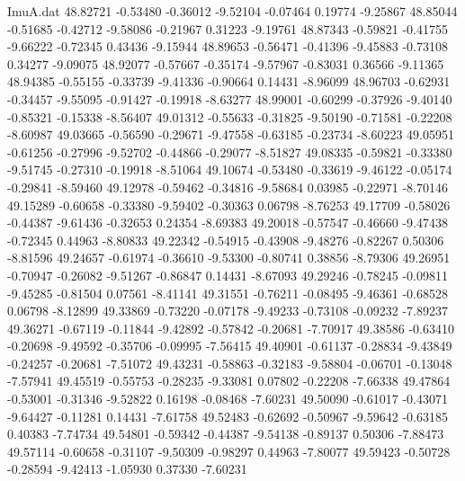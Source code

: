 \begin{filecontents}{ImuA.dat}
  48.82721   -0.53480   -0.36012   -9.52104   -0.07464    0.19774   -9.25867
  48.85044   -0.51685   -0.42712   -9.58086   -0.21967    0.31223   -9.19761
  48.87343   -0.59821   -0.41755   -9.66222   -0.72345    0.43436   -9.15944
  48.89653   -0.56471   -0.41396   -9.45883   -0.73108    0.34277   -9.09075
  48.92077   -0.57667   -0.35174   -9.57967   -0.83031    0.36566   -9.11365
  48.94385   -0.55155   -0.33739   -9.41336   -0.90664    0.14431   -8.96099
  48.96703   -0.62931   -0.34457   -9.55095   -0.91427   -0.19918   -8.63277
  48.99001   -0.60299   -0.37926   -9.40140   -0.85321   -0.15338   -8.56407
  49.01312   -0.55633   -0.31825   -9.50190   -0.71581   -0.22208   -8.60987
  49.03665   -0.56590   -0.29671   -9.47558   -0.63185   -0.23734   -8.60223
  49.05951   -0.61256   -0.27996   -9.52702   -0.44866   -0.29077   -8.51827
  49.08335   -0.59821   -0.33380   -9.51745   -0.27310   -0.19918   -8.51064
  49.10674   -0.53480   -0.33619   -9.46122   -0.05174   -0.29841   -8.59460
  49.12978   -0.59462   -0.34816   -9.58684    0.03985   -0.22971   -8.70146
  49.15289   -0.60658   -0.33380   -9.59402   -0.30363    0.06798   -8.76253
  49.17709   -0.58026   -0.44387   -9.61436   -0.32653    0.24354   -8.69383
  49.20018   -0.57547   -0.46660   -9.47438   -0.72345    0.44963   -8.80833
  49.22342   -0.54915   -0.43908   -9.48276   -0.82267    0.50306   -8.81596
  49.24657   -0.61974   -0.36610   -9.53300   -0.80741    0.38856   -8.79306
  49.26951   -0.70947   -0.26082   -9.51267   -0.86847    0.14431   -8.67093
  49.29246   -0.78245   -0.09811   -9.45285   -0.81504    0.07561   -8.41141
  49.31551   -0.76211   -0.08495   -9.46361   -0.68528    0.06798   -8.12899
  49.33869   -0.73220   -0.07178   -9.49233   -0.73108   -0.09232   -7.89237
  49.36271   -0.67119   -0.11844   -9.42892   -0.57842   -0.20681   -7.70917
  49.38586   -0.63410   -0.20698   -9.49592   -0.35706   -0.09995   -7.56415
  49.40901   -0.61137   -0.28834   -9.43849   -0.24257   -0.20681   -7.51072
  49.43231   -0.58863   -0.32183   -9.58804   -0.06701   -0.13048   -7.57941
  49.45519   -0.55753   -0.28235   -9.33081    0.07802   -0.22208   -7.66338
  49.47864   -0.53001   -0.31346   -9.52822    0.16198   -0.08468   -7.60231
  49.50090   -0.61017   -0.43071   -9.64427   -0.11281    0.14431   -7.61758
  49.52483   -0.62692   -0.50967   -9.59642   -0.63185    0.40383   -7.74734
  49.54801   -0.59342   -0.44387   -9.54138   -0.89137    0.50306   -7.88473
  49.57114   -0.60658   -0.31107   -9.50309   -0.98297    0.44963   -7.80077
  49.59423   -0.50728   -0.28594   -9.42413   -1.05930    0.37330   -7.60231

\end{filecontents}

